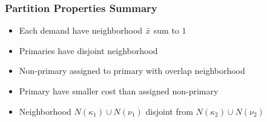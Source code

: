 \documentclass[handout, hyperref, dvipsnames]{beamer}
\begin{document}
\begin{frame}
  \frametitle{Partition Properties Summary}
  \begin{itemize}
    \addtolength{\itemsep}{1\baselineskip}
  \item Each demand have neighborhood ${\bar x}$ sum to $1$
  \item Primaries have disjoint neighborhood
  \item Non-primary assigned to primary with overlap neighborhood
  \item Primary have smaller cost than assigned non-primary
  \item Neighborhood $N(\kappa_1) \cup N(\nu_1)$ disjoint from $N(\kappa_2) \cup N(\nu_2)$
  \end{itemize}
\end{frame}
\end{document}
